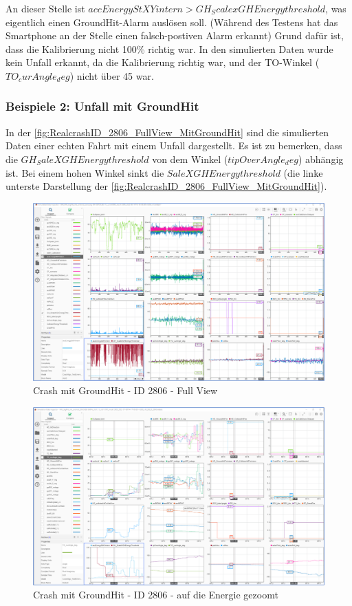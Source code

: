 An dieser Stelle ist $accEnergyStXYintern > GH_ScalexGHEnergythreshold$, was eigentlich einen GroundHit-Alarm auslösen soll. (Während des Testens hat das Smartphone an der Stelle einen falsch-postiven Alarm erkannt) Grund dafür ist, dass die Kalibrierung nicht 100\% richtig war.
In den simulierten Daten wurde kein Unfall erkannt, da die Kalibrierung richtig war, und der TO-Winkel ($TO_curAngle_deg$) nicht über 45 war.

\subsubsection{Beispiele 2: Unfall mit GroundHit}
In der \autoref{fig:RealcrashID_2806_FullView_MitGroundHit} sind die simulierten Daten einer echten Fahrt mit einem Unfall dargestellt. Es ist zu bemerken, dass die $GH_SaleXGHEnergythreshold$ von dem Winkel ($tipOverAngle_deg$) abhängig ist. Bei einem hohen Winkel sinkt die $SaleXGHEnergythreshold$ (die linke unterste Darstellung der \autoref{fig:RealcrashID_2806_FullView_MitGroundHit}).
\begin{figure}[H]
	\centering
	\includegraphics[width=\linewidth]{Bilder/RealcrashID_2806_FullView_MitGroundHit.png}
	\caption{Crash mit GroundHit - ID 2806 - Full View}
	\label{fig:RealcrashID_2806_FullView_MitGroundHit}
\end{figure}
\begin{figure}[H]
	\centering
	\includegraphics[width=\linewidth]{Bilder/RealcrashID_2806_EnergyZoomed_MitGroundHit.png}
	\caption{Crash mit GroundHit - ID 2806 - auf die Energie gezoomt}
	\label{fig:RealcrashID_2806_EnergyZoomed_MitGroundHit}
\end{figure}
